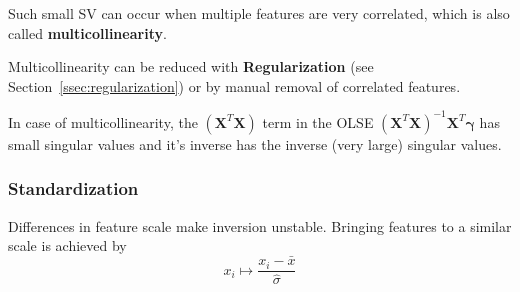 Such small SV can occur when multiple features are very correlated, which is also called \textbf{multicollinearity}.

Multicollinearity can be reduced with \textbf{Regularization} (see Section\ \ref{ssec:regularization}) or by manual removal of correlated features.

\newpar{}

In case of multicollinearity, the $(\mathbf{X}^T \mathbf{X})$ term in the OLSE ${(\mathbf{X}^T \mathbf{X})}^{-1}\mathbf{X}^T\boldsymbol{\gamma}$ has small singular values and it's inverse has the inverse (very large) singular values.

\subsubsection{Standardization}
Differences in feature scale make inversion unstable. Bringing features to a similar scale is achieved by
\noindent\begin{equation*}
    x_i\mapsto\frac{x_i-\bar{x}}{\widehat{\sigma}}
\end{equation*}
